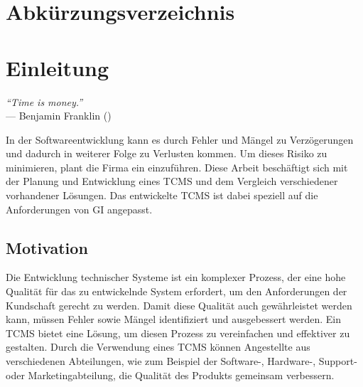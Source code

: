 \documentclass[a4paper, fontsize=11pt, parskip=half, twoside, headings=openright]{scrreprt}
\begin{document}
	\chapter*{Abkürzungsverzeichnis}
	\begin{acronym}
	
	\end{acronym}
	
	\cleardoublepage
	
	\chapter{Einleitung}
	
	\begin{flushright}
		\rightskip=8cm\textit{``Time is money.''} \\
		\vspace{.2em}
		\rightskip=3cm--- Benjamin Franklin (\textcite{franklin_advice_1748})
	\end{flushright}

	In der Softwareentwicklung kann es durch Fehler und Mängel zu Verzögerungen und dadurch in weiterer Folge zu Verlusten kommen.
	Um dieses Risiko zu minimieren, plant die Firma  ein  einzuführen.
	Diese Arbeit beschäftigt sich mit der Planung und Entwicklung eines \ac{TCMS} und dem Vergleich verschiedener vorhandener Lösungen. 
	Das entwickelte \ac{TCMS} ist dabei speziell auf die Anforderungen von \ac{GI} angepasst.
	
	
	\section{Motivation} \label{sec:motivation}
	Die Entwicklung technischer Systeme ist ein komplexer Prozess, der eine hohe Qualität für das zu entwickelnde System erfordert, um den Anforderungen der Kundschaft gerecht zu werden. 
	Damit diese Qualität auch gewährleistet werden kann, müssen Fehler sowie Mängel identifiziert und ausgebessert werden. 
	Ein \ac{TCMS} bietet eine Lösung, um diesen Prozess zu vereinfachen und effektiver zu gestalten. 
	Durch die Verwendung eines \ac{TCMS} können Angestellte aus verschiedenen Abteilungen, wie zum Beispiel der Software-, Hardware-, Support- oder Marketingabteilung, die Qualität des Produkts gemeinsam verbessern. 
	
\end{document}
